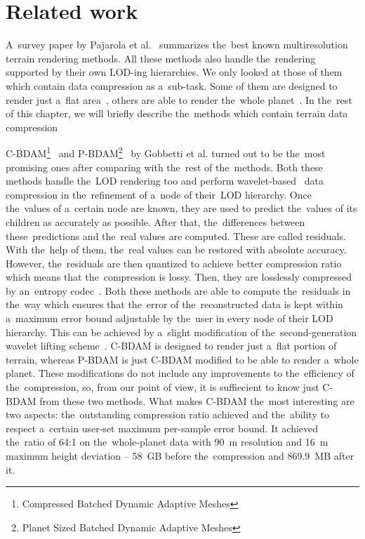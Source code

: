 \chapter{Related work}\label{chap:related_works}

 A~survey paper by Pajarola et al.~\cite{survey} summarizes the~best known multiresolution terrain rendering methods. All these methods also handle the~rendering supported by their own LOD-ing hierarchies. We only looked at those of them which contain data compression as a~sub-task. Some of them are designed to render just a~flat area~\cite{cbdam, jpeg2000terrain, meshesGPU1, meshesGPU2}, others are able to render the~whole planet~\cite{pbdam, meshes}. In the~rest of this chapter, we will briefly describe the~methods which contain terrain data compression
 
 C-BDAM\footnote{Compressed Batched Dynamic Adaptive Meshes}~\cite{cbdam} and P-BDAM\footnote{Planet Sized Batched Dynamic Adaptive Meshes}~\cite{pbdam} by Gobbetti et al. turned out to be the~most promising ones after comparing with the~rest of the~methods. Both these methods handle the~LOD rendering too and perform wavelet-based~\cite{waveletsTutorial} data compression in the~refinement of a~node of their~LOD hierarchy. Once the~values of a~certain node are known, they are used to predict the~values of its children as accurately as possible. After that, the~differences between these~predictions and the~real values are computed. These are called residuals. With the~help of them, the~real values can be restored with absolute accuracy. However, the~residuals are then quantized to achieve better compression ratio which means that the~compression is lossy. Then, they are losslessly compressed by an~entropy codec~\cite{entropy1, entropy2}. Both these methods are able to compute the~residuals in the~way which ensures that the~error of the~reconstructed data is kept within a~maximum error bound adjustable by the~user in every node of their LOD hierarchy. This can be achieved by a~slight modification of the~second-generation wavelet lifting scheme~\cite{two-stage}. C-BDAM is designed to render just a~flat portion of terrain, whereas P-BDAM is just C-BDAM modified to be able to render a~whole planet. These modifications do not include any improvements to the~efficiency of the~compression, so, from our point of view, it is suffiecient to know just C-BDAM from these two methods. What makes C-BDAM the~most interesting are two aspects: the~outstanding compression ratio achieved and the~ability to respect a~certain user-set maximum per-sample error bound. It achieved the~ratio of 64:1 on the~whole-planet data with 90~m resolution and 16~m maximum height deviation -- 58~GB before the~compression and 869.9~MB after it.
 
